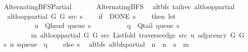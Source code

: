 %
\begin{isabellebody}%
%
%
\isadelimtheory
%
\endisadelimtheory
%
\isatagtheory
{}\isamarkupfalse%
\ Alternating{\isacharunderscore}{\kern0pt}BFS{\isacharunderscore}{\kern0pt}Partial\isanewline
\ \ \isanewline
\ \ \ \ Alternating{\isacharunderscore}{\kern0pt}BFS\isanewline
{}%
\endisatagtheory
{\isafoldtheory}%
%
\isadelimtheory
\isanewline
%
\endisadelimtheory
\isanewline
{}\isamarkupfalse%
\ {\isacharparenleft}{\kern0pt}\ alt{\isacharunderscore}{\kern0pt}bfs{\isacharparenright}{\kern0pt}\ {\isacharparenleft}{\kern0pt}tailrec{\isacharparenright}{\kern0pt}\ alt{\isacharunderscore}{\kern0pt}loop{\isacharunderscore}{\kern0pt}partial\ \isanewline
\ \ {\isachardoublequoteopen}alt{\isacharunderscore}{\kern0pt}loop{\isacharunderscore}{\kern0pt}partial\ G{}\ G{}\ src\ s\ {\isacharequal}{\kern0pt}\isanewline
\ \ \ {\isacharparenleft}{\kern0pt}if\ {\isasymnot}\ DONE\ s\isanewline
\ \ \ \ then\ let\isanewline
\ \ \ \ \ \ \ \ \ \ u\ {\isacharequal}{\kern0pt}\ Q{\isacharunderscore}{\kern0pt}head\ {\isacharparenleft}{\kern0pt}queue\ s{\isacharparenright}{\kern0pt}{\isacharsemicolon}{\kern0pt}\isanewline
\ \ \ \ \ \ \ \ \ \ q\ {\isacharequal}{\kern0pt}\ Q{\isacharunderscore}{\kern0pt}tail\ {\isacharparenleft}{\kern0pt}queue\ s{\isacharparenright}{\kern0pt}\isanewline
\ \ \ \ \ \ \ \ \ in\ alt{\isacharunderscore}{\kern0pt}loop{\isacharunderscore}{\kern0pt}partial\ G{}\ G{}\ src\ {\isacharparenleft}{\kern0pt}List{\isachardot}{\kern0pt}fold\ {\isacharparenleft}{\kern0pt}traverse{\isacharunderscore}{\kern0pt}edge\ src\ u{\isacharparenright}{\kern0pt}\ {\isacharparenleft}{\kern0pt}adjacency\ G{}\ G{}\ s\ u{\isacharparenright}{\kern0pt}\ {\isacharparenleft}{\kern0pt}s{\isasymlparr}queue\ {\isacharcolon}{\kern0pt}{\isacharequal}{\kern0pt}\ q{\isasymrparr}{\isacharparenright}{\kern0pt}{\isacharparenright}{\kern0pt}\isanewline
\ \ \ \ else\ s{\isacharparenright}{\kern0pt}{\isachardoublequoteclose}\isanewline
\isanewline
{}\isamarkupfalse%
\ {\isacharparenleft}{\kern0pt}\ alt{\isacharunderscore}{\kern0pt}bfs{\isacharparenright}{\kern0pt}\ alt{\isacharunderscore}{\kern0pt}bfs{\isacharunderscore}{\kern0pt}partial\ {\isacharcolon}{\kern0pt}{\isacharcolon}{\kern0pt}\ {\isachardoublequoteopen}{\isacharprime}{\kern0pt}n\ {\isasymRightarrow}\ {\isacharprime}{\kern0pt}n\ {\isasymRightarrow}\ {\isacharprime}{\kern0pt}a\ {\isasymRightarrow}\ {\isacharprime}{\kern0pt}m{\isachardoublequoteclose}\ \isanewline

\end{isabellebody}
